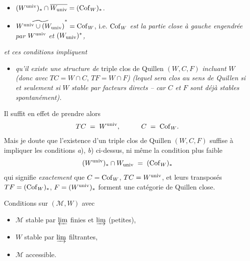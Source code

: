 \begin{itemize}[leftmargin=3em]
\item[\cercle{a}] $(W^{\mathrm{univ}})_* \cap \overline{W_{\mathrm{univ}}} = (\mathrm{Cof}_W)_*$.

\item[\cercle{b}] $\widetilde{W^{\mathrm{univ}} \cup (W_{\mathrm{univ}})}^{*} = \mathrm{Cof}_W$, i.e. $\mathrm{Cof}_W$ \textit{est la partie close à gauche engendrée par} $W^{\mathrm{univ}}$ \textit{et} $(W_{\mathrm{univ}})^*$\textit{,} %
\end{itemize}

\noindent\textit{et ces conditions impliquent}

\begin{itemize}[leftmargin=3em]
\item[\cercle{c}] \textit{qu'il existe une structure de} triple clos de Quillen $(W, C, F)$ \textit{incluant} $W$ \textit{(donc avec} $TC = W \cap C$, $TF = W \cap F$\textit{) (lequel sera clos au sens de Quillen si et seulement si} $W$ \textit{stable par facteurs directs -- car $C$ et $F$ sont déjà stables spontanément).}
\end{itemize}

\noindent Il suffit en effet de prendre alors
\[
TC \;=\; W^{\mathrm{univ}}, \qquad\quad C \;=\; \mathrm{Cof}_W .
\]
Mais je doute que l'existence d'un triple clos de Quillen $(W, C, F)$ suffise à impliquer les conditions \textit{a}), \textit{b}) ci-dessus, ni même la condition plus faible
\[
(W^{\mathrm{univ}})_* \cap W_{\mathrm{univ}} \;=\; (\mathrm{Cof}_W)_*
\]
qui signifie \textit{exactement} que $C = \mathrm{Cof}_W$, $TC = W^{\mathrm{univ}}$, et leurs transposés $TF = (\mathrm{Cof}_W)_*$, $F = (W^{\mathrm{univ}})_*$ forment une catégorie de Quillen close.

\clearpage
{}

\noindent Conditions sur $(\mathcal{M}, W)$ avec
\begin{itemize}[leftmargin=3em]
\item[\textit{a})] $\mathcal{M}$ stable par $\varprojlim$ finies et $\varinjlim$ (petites),
\item[\textit{b})] $W$ stable par $\varinjlim$ filtrantes,
\item[\textit{c})] $\mathcal{M}$ accessible.
\end{itemize}

